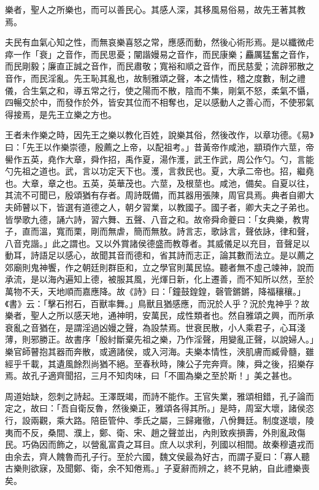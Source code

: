 \begin{pinyinscope}
樂者，聖人之所樂也，而可以善民心。其感人深，其移風易俗易，故先王著其教焉。

夫民有血氣心知之性，而無哀樂喜怒之常，應感而動，然後心術形焉。是以纖微虍瘁一作「衰」之音作，而民思憂；闡諧嫚易之音作，而民康樂；麤厲猛奮之音作，而民剛毅；廉直正誠之音作，而民肅敬；寬裕和順之音作，而民慈愛；流辟邪散之音作，而民淫亂。先王恥其亂也，故制雅頌之聲，本之情性，稽之度數，制之禮儀，合生氣之和，導五常之行，使之陽而不散，陰而不集，剛氣不怒，柔氣不懾，四暢交於中，而發作於外，皆安其位而不相奪也，足以感動人之善心而，不使邪氣得接焉，是先王立樂之方也。

王者未作樂之時，因先王之樂以教化百姓，說樂其俗，然後改作，以章功德。《易》曰：「先王以作樂崇德，殷薦之上帝，以配祖考。」昔黃帝作咸池，顓頊作六莖，帝嚳作五英，堯作大章，舜作招，禹作夏，湯作濩，武王作武，周公作勺。勺，言能勺先祖之道也。武，言以功定天下也。濩，言救民也。夏，大承二帝也。招，繼堯也。大章，章之也。五英，英華茂也。六莖，及根莖也。咸池，備矣。自夏以往，其流不可聞已，殷頌猶有存者。周詩既備，而其器用張陳，周官具焉。典者自卿大夫師瞽以下，皆選有道德之人，朝夕習業，以教國子。國子者，卿大夫之子弟也。皆學歌九德，誦六詩，習六舞、五聲、八音之和。故帝舜命夔曰：「女典樂，教冑子，直而溫，寬而栗，剛而無虐，簡而無敖。詩言志，歌詠言，聲依詠，律和聲，八音克諧。」此之謂也。又以外賞諸侯德盛而教尊者。其威儀足以充目，音聲足以動耳，詩語足以感心，故聞其音而德和，省其詩而志正，論其數而法立。是以薦之郊廟則鬼神饗，作之朝廷則群臣和，立之學官則萬民協。聽者無不虛己竦神，說而承流，是以海內遍知上德，被服其風，光煇日新，化上遷善，而不知所以然，至於萬物不夭，天地順而嘉應降。故《詩》曰：「鐘鼓鍠鍠，磬管鏘鏘，降福穰穰。」《書》云：「擊石拊石，百獸率舞。」鳥獸且猶感應，而況於人乎？況於鬼神乎？故樂者，聖人之所以感天地，通神明，安萬民，成性類者也。然自雅頌之興，而所承衰亂之音猶在，是謂淫過凶嫚之聲，為設禁焉。世衰民散，小人乘君子，心耳淺薄，則邪勝正。故書序「殷紂斷棄先祖之樂，乃作淫聲，用變亂正聲，以說婦人。」樂官師瞽抱其器而奔散，或適諸侯，或入河海。夫樂本情性，浹肌膚而臧骨髓，雖經乎千載，其遺風餘烈尚猶不絕。至春秋時，陳公子完奔齊。陳，舜之後，招樂存焉。故孔子適齊聞招，三月不知肉味，曰「不圖為樂之至於斯！」美之甚也。

周道始缺，怨刺之詩起。王澤既竭，而詩不能作。王官失業，雅頌相錯，孔子論而定之，故曰：「吾自衛反魯，然後樂正，雅頌各得其所。」是時，周室大壞，諸侯恣行，設兩觀，乘大路。陪臣管仲、季氏之屬，三歸雍徹，八佾舞廷。制度遂壞，陵夷而不反，桑間、濮上，鄭、衛、宋、趙之聲並出，內則致疾損壽，外則亂政傷民。巧偽因而飾之，以營亂富貴之耳目。庶人以求利，列國以相間。故秦穆遺戎而由余去，齊人餽魯而孔子行。至於六國，魏文侯最為好古，而謂子夏曰：「寡人聽古樂則欲寐，及聞鄭、衛，余不知倦焉。」子夏辭而辨之，終不見納，自此禮樂喪矣。


\end{pinyinscope}

